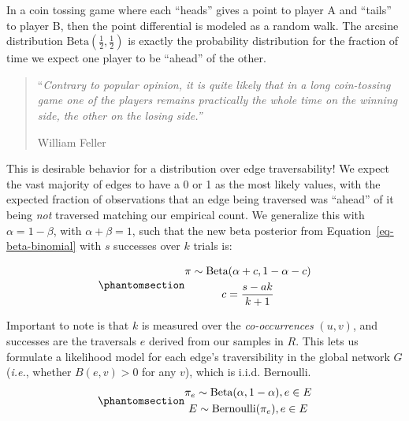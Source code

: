 \documentclass[%
	12pt,
		oneside,
		letterpaper
]{book}
\begin{document}
In a coin tossing game where each ``heads'' gives a point to player A
and ``tails'' to player B, then the point differential is modeled as a
random walk. The arcsine distribution
\(\text{Beta}(\tfrac{1}{2},\tfrac{1}{2})\) is exactly the probability
distribution for the fraction of time we expect one player to be
``ahead'' of the other. \autocite{WhatisArcsine_Ackelsberg2018}

\begin{quote}
``\emph{Contrary to popular opinion, it is quite likely that in a long
coin-tossing game one of the players remains practically the whole time
on the winning side, the other on the losing side.''}

William Feller\autocite[Chapter
III]{IntroductionProbabilityTheory_Feller1968}
\end{quote}

This is desirable behavior for a distribution over edge traversability!
We expect the vast majority of edges to have a 0 or 1 as the most likely
values, with the expected fraction of observations that an edge being
traversed was ``ahead'' of it being \emph{not} traversed matching our
empirical count. We generalize this with \(\alpha = 1-\beta\), with
\(\alpha + \beta = 1\), such that the new beta posterior from
Equation~\ref{eq-beta-binomial} with \(s\) successes over \(k\) trials
is:

\begin{equation}\phantomsection\label{eq-desirepath-binom}{
\begin{gathered}
\pi \sim \text{Beta}(\alpha + c, 1-\alpha-c) \\
c = \frac{s-ak}{k+1}\\
\end{gathered}
}\end{equation}

Important to note is that \(k\) is measured over the
\emph{co-occurrences} \((u,v)\), and successes are the traversals \(e\)
derived from our samples in \(R\). This lets us formulate a likelihood
model for each edge's traversibility in the global network \(G\)
(\emph{i.e.}, whether \(B(e,v)>0\) for any \(v\)), which is i.i.d.
Bernoulli. \begin{equation}\phantomsection\label{eq-empirical-model}{
\begin{gathered}
\pi_e \sim \text{Beta}(\alpha, 1-\alpha), e\in E\\ 
E \sim \text{Bernoulli}(\pi_e), e \in E
\end{gathered}
}\end{equation}
\end{document}
